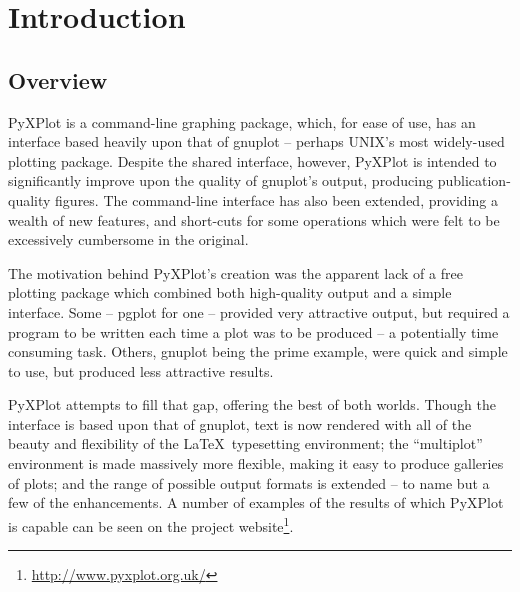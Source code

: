 %
%
%
%
%



\chapter{Introduction}

\label{introduction}

\section{Overview}

PyXPlot is a command-line graphing package, which, for ease of use, has an
interface based heavily upon that of gnuplot -- perhaps UNIX's most widely-used
plotting package. Despite the shared interface, however, PyXPlot is intended to
significantly improve upon the quality of gnuplot's output, producing
publication-quality figures. The command-line interface has also been extended,
providing a wealth of new features, and short-cuts for some operations which
were felt to be excessively cumbersome in the original.

The motivation behind PyXPlot's creation was the apparent lack of a free
plotting package which combined both high-quality output and a simple
interface.  Some -- pgplot for one -- provided very attractive output, but
required a program to be written each time a plot was to be produced -- a
potentially time consuming task. Others, gnuplot being the prime example, were
quick and simple to use, but produced less attractive results.

PyXPlot attempts to fill that gap, offering the best of both worlds. Though the
interface is based upon that of gnuplot, text is now rendered with all of the
beauty and flexibility of the \LaTeX\ typesetting environment; the
``multiplot'' environment is made massively more flexible, making it easy to
produce galleries of plots; and the range of possible output formats is
extended -- to name but a few of the enhancements. A number of examples of the
results of which PyXPlot is capable can be seen on the project
website\footnote{\url{http://www.pyxplot.org.uk/}}.

